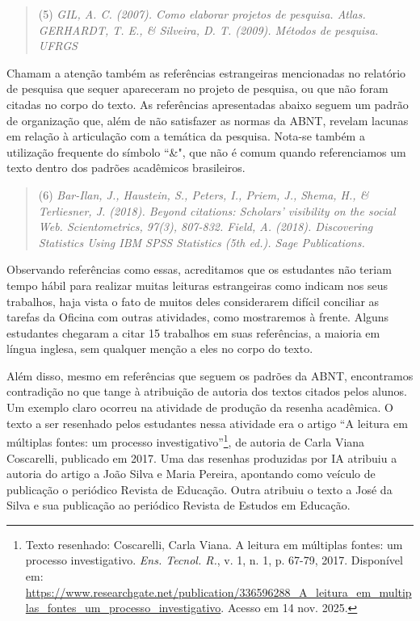\documentclass[portuguese]{textolivre}
\begin{document}
\begin{quote}
(5) \textit{GIL, A. C. (2007). Como elaborar projetos de pesquisa. Atlas. \newline
GERHARDT, T. E., \& Silveira, D. T. (2009). Métodos de pesquisa. UFRGS}
\end{quote}

Chamam a atenção também as referências estrangeiras mencionadas no relatório de pesquisa que sequer apareceram no projeto de pesquisa, ou que não foram citadas no corpo do texto. As referências apresentadas abaixo seguem um padrão de organização que, além de não satisfazer as normas da ABNT, revelam lacunas em relação à articulação com a temática da pesquisa. Nota-se também a utilização frequente do símbolo ``\&", que não é comum quando referenciamos um texto dentro dos padrões acadêmicos brasileiros.

\begin{quote}
(6) \textit{Bar-Ilan, J., Haustein, S., Peters, I., Priem, J., Shema, H., \& Terliesner, J. (2018). Beyond citations: Scholars' visibility on the social Web. Scientometrics, 97(3), 807-832. \newline
Field, A. (2018). Discovering Statistics Using IBM SPSS Statistics (5th ed.). Sage Publications.
}
\end{quote}

Observando referências como essas, acreditamos que os estudantes não teriam tempo hábil para realizar muitas leituras estrangeiras como indicam nos seus trabalhos, haja vista o fato de muitos deles considerarem difícil conciliar as tarefas da Oficina com outras atividades, como mostraremos à frente. Alguns estudantes chegaram a citar 15 trabalhos em suas referências, a maioria em língua inglesa, sem qualquer menção a eles no corpo do texto.

Além disso, mesmo em referências que seguem os padrões da ABNT, encontramos contradição no que tange à atribuição de autoria dos textos citados pelos alunos. Um exemplo claro ocorreu na atividade de produção da resenha acadêmica. O texto a ser resenhado pelos estudantes nessa atividade era o artigo ``A leitura em múltiplas fontes: um processo investigativo''\footnote{Texto resenhado: Coscarelli, Carla Viana. A leitura em múltiplas fontes: um processo investigativo. \textit{Ens. Tecnol. R.}, v. 1, n. 1, p. 67-79, 2017. Disponível em: \url{https://www.researchgate.net/publication/336596288_A_leitura_em_multiplas_fontes_um_processo_investigativo}. Acesso em 14 nov. 2025.}, de autoria de Carla Viana Coscarelli, publicado em 2017. Uma das resenhas produzidas por IA atribuiu a autoria do artigo a João Silva e Maria Pereira, apontando como veículo de publicação o periódico Revista de Educação. Outra atribuiu o texto a José da Silva e sua publicação ao periódico Revista de Estudos em Educação.
\end{document}
